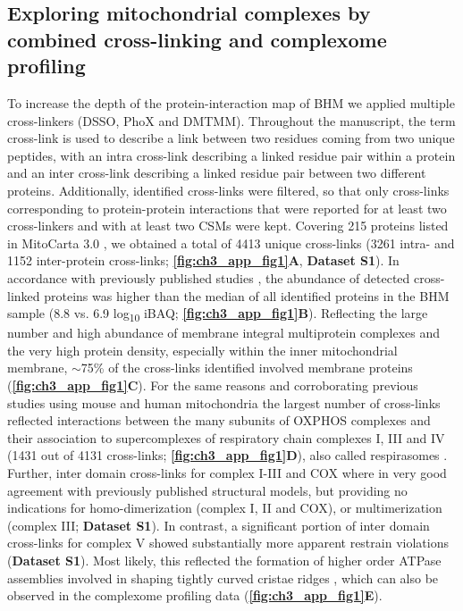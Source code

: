 \subsection*{Exploring mitochondrial complexes by combined cross-linking and complexome profiling}
To increase the depth of the protein-interaction map of BHM we applied multiple cross-linkers (DSSO, PhoX and DMTMM). Throughout the manuscript, the term cross-link is used to describe a link between two residues coming from two unique peptides, with an intra cross-link describing a linked residue pair within a protein and an inter cross-link describing a linked residue pair between two different proteins. Additionally, identified cross-links were filtered, so that only cross-links corresponding to protein-protein interactions that were reported for at least two cross-linkers and with at least two CSMs were kept. Covering 215 proteins listed in MitoCarta 3.0 \cite{RN21}, we obtained a total of 4413 unique cross-links (3261 intra- and 1152 inter-protein cross-links; \textbf{\autoref{fig:ch3_app_fig1}A}, \textbf{Dataset S1}). In accordance with previously published studies \cite{RN23, RN22}, the abundance of detected cross-linked proteins was higher than the median of all identified proteins in the BHM sample (8.8 vs. 6.9 log\textsubscript{10} iBAQ; \textbf{\autoref{fig:ch3_app_fig1}B}). Reflecting the large number and high abundance of membrane integral multiprotein complexes and the very high protein density, especially within the inner mitochondrial membrane, $\sim$75\% of the cross-links identified involved membrane proteins (\textbf{\autoref{fig:ch3_app_fig1}C}). For the same reasons and corroborating previous studies using mouse and human mitochondria \cite{RN16, RN21, RN19, RN17} the largest number of cross-links reflected interactions between the many subunits of OXPHOS complexes and their association to supercomplexes of respiratory chain complexes I, III and IV (1431 out of 4131 cross-links; \textbf{\autoref{fig:ch3_app_fig1}D}), also called respirasomes \cite{RN24}. Further, inter domain cross-links for complex I-III and COX where in very good agreement with previously published structural models, but providing no indications for homo-dimerization (complex I, II and COX), or multimerization (complex III; \textbf{Dataset S1}). In contrast, a significant portion of inter domain cross-links for complex V showed substantially more apparent restrain violations (\textbf{Dataset S1}). Most likely, this reflected the formation of higher order ATPase assemblies involved in shaping tightly curved cristae ridges \cite{RN25, RN26, RN27}, which can also be observed in the complexome profiling data (\textbf{\autoref{fig:ch3_app_fig1}E}).

